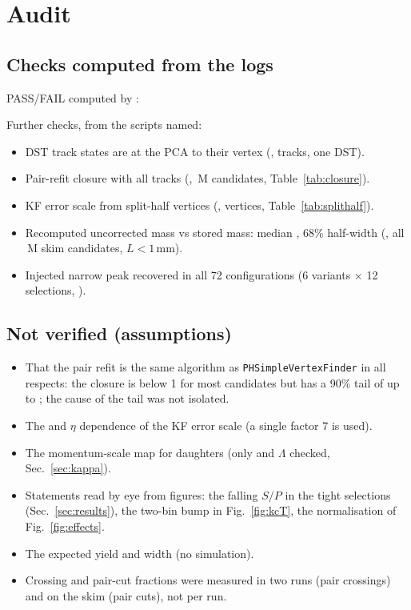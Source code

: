 \section{Audit}
\label{sec:audit}
\subsection{Checks computed from the logs}
PASS/FAIL computed by :
\begin{itemize}\small

\end{itemize}
Further checks, from the scripts named:
\begin{itemize}\small
\item DST track states are at the PCA to their vertex (, \tsVtxTracks{} tracks, one DST).
\item Pair-refit closure with all tracks (, \psN\,M candidates, Table~\ref{tab:closure}).
\item KF error scale from split-half vertices (, \splitSel{} vertices, Table~\ref{tab:splithalf}).
\item Recomputed uncorrected \Dzero{} mass vs stored mass: median \dmRcMed\mev, 68\% half-width \dmRcHw\mev{}
  (, all \kcN\,M skim candidates, $L<1$\,mm).
\item Injected narrow peak recovered in all 72 configurations (6 variants $\times$ 12 selections, ).
\end{itemize}

\subsection{Not verified (assumptions)}
\begin{itemize}\small
\item That the pair refit is the same algorithm as \texttt{PHSimpleVertexFinder} in all respects: the closure is
  below 1\um{} for most candidates but has a 90\% tail of up to \cloPairManyNinety\um; the cause of the tail was not
  isolated.
\item The \pt{} and $\eta$ dependence of the KF error scale (a single factor 7 is used).
\item The momentum-scale map for \Dzero{} daughters (only \Ks{} and $\Lambda$ checked, Sec.~\ref{sec:kappa}).
\item Statements read by eye from figures: the falling $S/P$ in the tight selections (Sec.~\ref{sec:results}), the
  two-bin bump in Fig.~\ref{fig:kcT}, the normalisation of Fig.~\ref{fig:effects}.
\item The expected \Dzero{} yield and width (no simulation).
\item Crossing and pair-cut fractions were measured in two runs (pair crossings) and on the skim (pair cuts), not per run.
\end{itemize}
